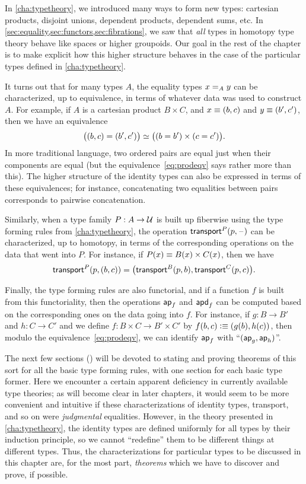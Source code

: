 In \autoref{cha:typetheory}, we introduced many ways to form new types: cartesian products, disjoint unions, dependent products, dependent sums, etc.
In \autoref{sec:equality,sec:functors,sec:fibrations}, we saw that \emph{all} types in homotopy type theory behave like spaces or higher groupoids.
Our goal in the rest of the chapter is to make explicit how this higher structure behaves in the case of the particular types defined in \autoref{cha:typetheory}.

It turns out that for many types $A$, the equality types $\id[A]xy$ can be characterized, up to equivalence, in terms of whatever data was used to construct $A$.
For example, if $A$ is a cartesian product $B\times C$, and $x\jdeq (b,c)$ and $y\jdeq(b',c')$, then we have an equivalence
\begin{equation}\label{eq:prodeqv}
  \eqv{\big((b,c)=(b',c')\big)}{\big((b=b')\times (c=c')\big)}.
\end{equation}
In more traditional language, two ordered pairs are equal just when their components are equal (but the equivalence~\eqref{eq:prodeqv} says rather more than this).
The higher structure of the identity types can also be expressed in terms of these equivalences; for instance, concatenating two equalities between pairs corresponds to pairwise concatenation.

Similarly, when a type family $P:A\to\type$ is built up fiberwise using the type forming rules from \autoref{cha:typetheory}, the operation $\transfib{P}{p}{\blank}$ can be characterized, up to homotopy, in terms of the corresponding operations on the data that went into $P$.
For instance, if $P(x) \jdeq B(x)\times C(x)$, then we have
\[\transfib{P}{p}{(b,c)} = \big(\transfib{B}{p}{b},\transfib{C}{p}{c}\big).\]

Finally, the type forming rules are also functorial, and if a function $f$ is built from this functoriality, then the operations $\apfunc f$ and $\apdfunc f$ can be computed based on the corresponding ones on the data going into $f$.
For instance, if $g:B\to B'$ and $h:C\to C'$ and we define $f:B\times C \to B'\times C'$ by $f(b,c)\defeq (g(b),h(c))$, then modulo the equivalence~\eqref{eq:prodeqv}, we can identify $\apfunc f$ with ``$(\apfunc g,\apfunc h)$''.

The next few sections () will be devoted to stating and proving theorems of this sort for all the basic type forming rules, with one section for each basic type former.
Here we encounter a certain apparent deficiency in currently available type theories;
as will become clear in later chapters, it would seem to be more convenient and intuitive if these characterizations of identity types, transport, and so on were \emph{judgmental} equalities.
However, in the theory presented in \autoref{cha:typetheory}, the identity types are defined uniformly for all types by their induction principle, so we cannot ``redefine'' them to be different things at different types.
Thus, the characterizations for particular types to be discussed in this chapter are, for the most part, \emph{theorems} which we have to discover and prove, if possible.

